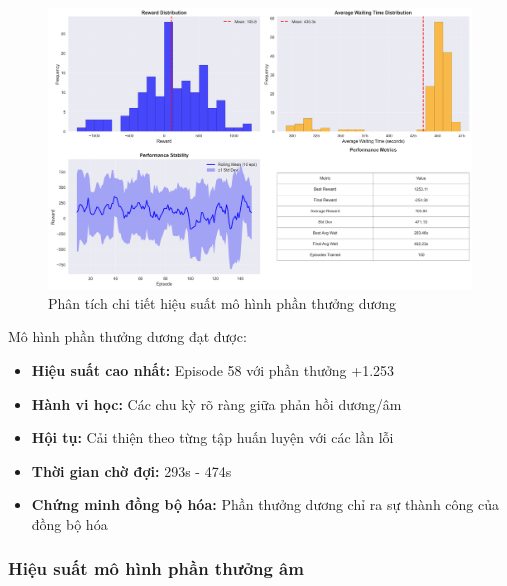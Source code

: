 \begin{figure}[!htp]
    \centering
    \includegraphics[width=\textwidth]{figures/sync_positive_model_summary.png}
    \caption{Phân tích chi tiết hiệu suất mô hình phần thưởng dương}
    \label{fig:sync_positive_model_summary}
\end{figure}

Mô hình phần thưởng dương đạt được:
\begin{itemize}
    \item \textbf{Hiệu suất cao nhất:} Episode 58 với phần thưởng +1.253

    \item \textbf{Hành vi học:} Các chu kỳ rõ ràng giữa phản hồi dương/âm

    \item \textbf{Hội tụ:} Cải thiện theo từng tập huấn luyện với các lần lỗi

    \item \textbf{Thời gian chờ đợi:} 293s - 474s

    \item \textbf{Chứng minh đồng bộ hóa:} Phần thưởng dương chỉ ra sự thành công của đồng bộ hóa
\end{itemize}

\subsubsection{Hiệu suất mô hình phần thưởng âm}

